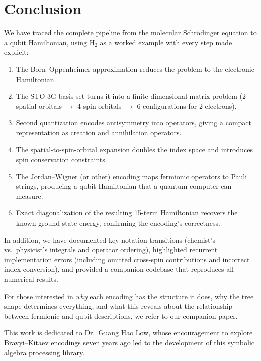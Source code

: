 \documentclass[aps,prb,preprint,longbibliography,nofootinbib]{revtex4-2}
\begin{document}
\section{Conclusion}
\label{sec:conclusion}

We have traced the complete pipeline from the molecular Schr\"odinger
equation to a qubit Hamiltonian, using H$_2$ as a worked example with
every step made explicit:

\begin{enumerate}
\item The Born--Oppenheimer approximation reduces the problem to the
  electronic Hamiltonian.
\item The STO-3G basis set turns it into a finite-dimensional matrix
  problem (2 spatial orbitals $\to$ 4 spin-orbitals $\to$ 6
  configurations for 2 electrons).
\item Second quantization encodes antisymmetry into operators, giving a
  compact representation as creation and annihilation operators.
\item The spatial-to-spin-orbital expansion doubles the index space and
  introduces spin conservation constraints.
\item The Jordan--Wigner (or other) encoding maps fermionic operators to
  Pauli strings, producing a qubit Hamiltonian that a quantum computer
  can measure.
\item Exact diagonalization of the resulting 15-term Hamiltonian
  recovers the known ground-state energy, confirming the encoding's
  correctness.
\end{enumerate}

In addition, we have documented key notation transitions (chemist's vs.\
physicist's integrals and operator ordering), highlighted recurrent
implementation errors (including omitted cross-spin contributions and
incorrect index conversion), and provided a companion codebase that
reproduces all numerical results.

For those interested in \emph{why} each encoding has the structure it
does, why the tree shape determines everything, and what this reveals
about the relationship between fermionic and qubit descriptions, we
refer to our companion paper.

\begin{acknowledgments}
This work is dedicated to Dr.\ Guang Hao Low, whose encouragement to
explore Bravyi--Kitaev encodings seven years ago led to the development
of this symbolic algebra processing library.
\end{acknowledgments}
\end{document}
